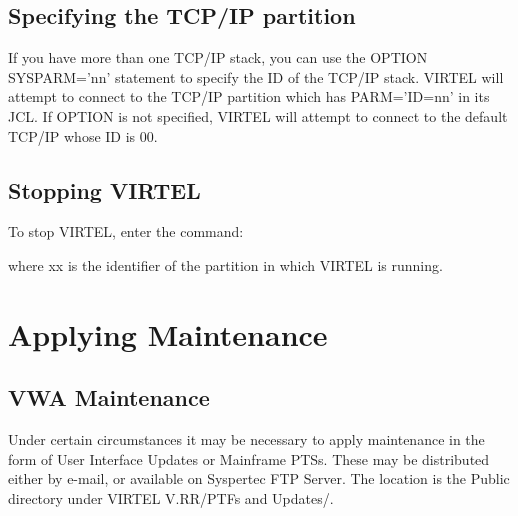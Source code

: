 \documentclass[letterpaper,10pt,english]{sphinxmanual}
\begin{document}
\subsection{Specifying the TCP/IP partition}
\label{\detokenize{Installation_Guide:specifying-the-tcp-ip-partition}}
If you have more than one TCP/IP stack, you can use the OPTION SYSPARM=’nn’ statement to specify the ID of the TCP/IP stack. VIRTEL will attempt to connect to the TCP/IP partition which has PARM=’ID=nn’ in its JCL. If OPTION is not specified, VIRTEL will attempt to connect to the default TCP/IP whose ID is 00.


\subsection{Stopping VIRTEL}
\label{\detokenize{Installation_Guide:id3}}
To stop VIRTEL, enter the command:

\begin{sphinxVerbatim}[commandchars=\\\{\}]
 
\end{sphinxVerbatim}

where xx is the identifier of the partition in which VIRTEL is running.

\newpage


\section{Applying Maintenance}
\label{\detokenize{Installation_Guide:id4}}\label{\detokenize{Installation_Guide:index-20}}

\subsection{VWA Maintenance}
\label{\detokenize{Installation_Guide:vwa-maintenance}}
Under certain circumstances it may be necessary to apply maintenance in the form of User Interface Updates or Mainframe PTSs. These may be distributed either by e-mail, or available on Syspertec FTP Server. The location is the Public directory under VIRTEL V.RR/PTFs and Updates/.
\end{document}
